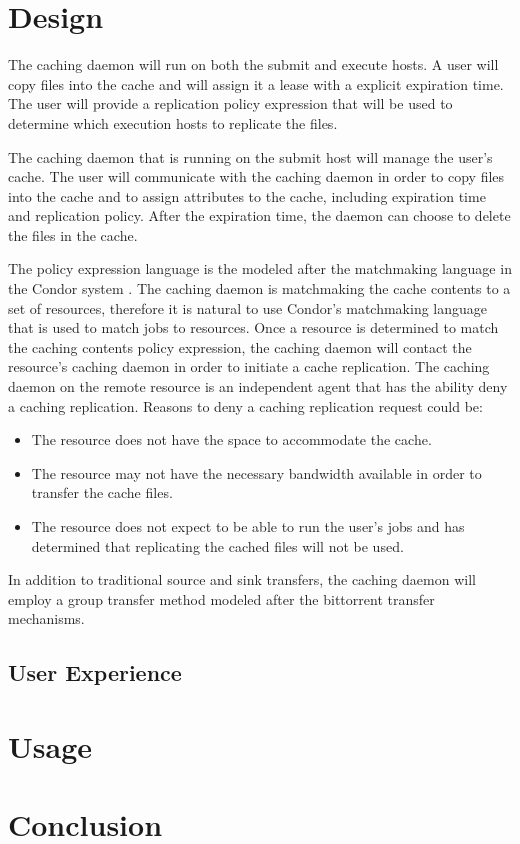 \section{Design}

The caching daemon will run on both the submit and execute hosts.  A user will copy files into the cache and will assign it a lease with a explicit expiration time.  The user will provide a replication policy expression that will be used to determine which execution hosts to replicate the files.

The caching daemon that is running on the submit host will manage the user's cache.  The user will communicate with the caching daemon in order to copy files into the cache and to assign attributes to the cache, including expiration time and replication policy.  After the expiration time, the daemon can choose to delete the files in the cache.  

The policy expression language is the modeled after the matchmaking language in the Condor system \cite{raman1998matchmaking}.  The caching daemon is matchmaking the cache contents to a set of resources, therefore it is natural to use Condor's matchmaking language that is used to match jobs to resources.  Once a resource is determined to match the caching contents policy expression, the caching daemon will contact the resource's caching daemon in order to initiate a cache replication.  The caching daemon on the remote resource is an independent agent that has the ability deny a caching replication.  Reasons to deny a caching replication request could be:

\begin{itemize}
\item The resource does not have the space to accommodate the cache.
\item The resource may not have the necessary bandwidth available in order to transfer the cache files.
\item The resource does not expect to be able to run the user's jobs and has determined that replicating the cached files will not be used.
\end{itemize}

In addition to traditional source and sink transfers, the caching daemon will employ a group transfer method modeled after the bittorrent \cite{cohen2008bittorrent} transfer mechanisms.

\subsection{User Experience}

\section{Usage}


\section{Conclusion}




